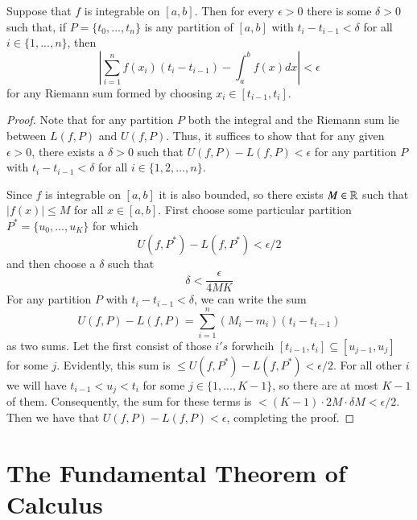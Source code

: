 \documentclass[12pt, a4paper, oneside, openright, titlepage]{book}
\begin{document}
\begin{thm}
    Suppose that $f$ is integrable on $[a,b]$. Then for every $\epsilon > 0$ there is some $\delta > 0$ such that, if $P = \{t_0,...,t_n\}$ is any partition of $[a,b]$ with $t_i - t_{i-1} < \delta$ for all $i \in \{1,...,n\}$, then \begin{equation*}
        \left|\sum\limits_{i=1}^nf(x_i)(t_i-t_{i-1}) - \int_a^bf(x)dx\right| < \epsilon
    \end{equation*}
    for any Riemann sum formed by choosing $x_i \in [t_{i-1},t_i]$.
\end{thm}
\begin{proof}
    Note that for any partition $P$ both the integral and the Riemann sum lie between $L(f,P)$ and $U(f,P)$. Thus, it suffices to show that for any given $\epsilon > 0$, there exists a $\delta > 0$ such that $U(f,P) - L(f,P) < \epsilon$ for any partition $P$ with $t_i - t_{i-1} < \delta$ for all $i \in \{1,2,...,n\}$.

    Since $f$ is integrable on $[a,b]$ it is also bounded, so there exists $M \in \mathbb R$ such that $|f(x)| \leq M$ for all $x \in [a,b]$. First choose some particular partition $P^* = \{u_0,...,u_K\}$ for which \begin{equation*}
        U(f,P^*) - L(f,P^*) < \epsilon/2
    \end{equation*}
    and then choose a $\delta$ such that \begin{equation*}
        \delta < \frac{\epsilon}{4MK}
    \end{equation*}
    For any partition $P$ with $t_i - t_{i-1} < \delta$, we can write the sum \begin{equation*}
        U(f,P) - L(f,P) = \sum_{i=1}^n(M_i-m_i)(t_i-t_{i-1})
    \end{equation*}
    as two sums. Let the first consist of those $i's$ forwhcih $[t_{i-1},t_i] \subseteq [u_{j-1},u_j]$ for some $j$. Evidently, this sum is $\leq U(f,P^*) - L(f,P^*) <\epsilon/2$. For all other $i$ we will have $t_{i-1} < u_j < t_i$ for some $j \in \{1,...,K-1\}$, so there are at most $K-1$ of them. Consequently, the sum for these terms is $< (K-1)\cdot 2M\cdot \delta M < \epsilon/2$. Then we have that $U(f,P) - L(f,P) < \epsilon$, completing the proof.
\end{proof}


\section{The Fundamental Theorem of Calculus}
\end{document}
